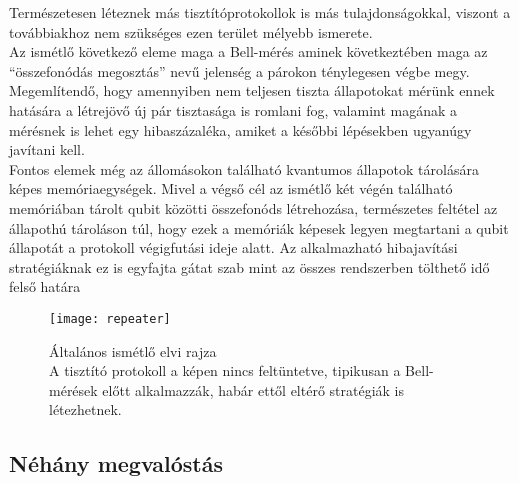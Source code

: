 Természetesen léteznek más tisztítóprotokollok is más tulajdonságokkal, viszont a továbbiakhoz nem szükséges ezen terület mélyebb ismerete.%
\\
Az ismétlő következő eleme maga a Bell-mérés aminek következtében maga az ``összefonódás megosztás'' nevű jelenség a párokon ténylegesen végbe megy. Megemlítendő, hogy amennyiben nem teljesen tiszta állapotokat mérünk ennek hatására a létrejövő új pár tisztasága is romlani fog, valamint magának a mérésnek is lehet egy hibaszázaléka\cite{lutkenhaus1999bell}, amiket a későbbi lépésekben ugyanúgy javítani kell.\\
Fontos elemek még az állomásokon található kvantumos állapotok tárolására képes memóriaegységek. Mivel a végső cél az ismétlő két végén található memóriában tárolt qubit közötti összefonóds létrehozása, természetes feltétel az állapothú tároláson túl, hogy ezek a memóriák képesek legyen megtartani a qubit állapotát a protokoll végigfutási ideje alatt. Az alkalmazható hibajavítási stratégiáknak ez is egyfajta gátat szab mint az összes rendszerben tölthető idő felső határa \\
\begin{figure}[h]
\centering
\texttt{[image: repeater]}
\caption[Általános ismétlő]{Általános ismétlő elvi rajza\\ A tisztító protokoll a képen nincs feltüntetve, tipikusan a Bell-mérések előtt alkalmazzák, habár ettől eltérő stratégiák is létezhetnek.}
\end{figure}

\subsection{Néhány megvalóstás}

